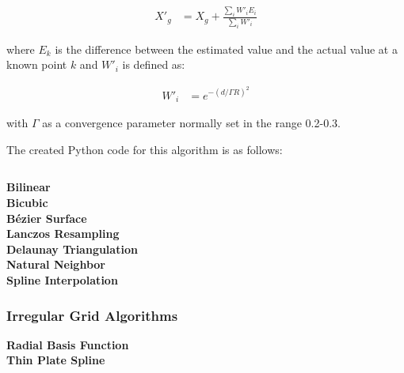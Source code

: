 				\begin{align*}
					X'_{g} &= X_{g} + \frac{\sum_{i}{W'_{i}E_{i}}}{\sum_{i}{W'_{i}}}
				\end{align*}

				where $E_{k}$ is the difference between the estimated value and the actual value at a known point $k$ and $W'_{i}$ is defined as:

				\begin{align*}
					W'_{i} &= e^{-(d/\Gamma R)^{2}}
				\end{align*}

				with $\Gamma$ as a convergence parameter normally set in the range 0.2-0.3.

				The created Python code for this algorithm is as follows:

				\inputminted[mathescape,linenos,numbersep=5pt,frame=lines,framesep=2mm]{python}{./code/barnes.py}

			\textbf{Bilinear}\label{datavalidation_bilinear} \\


			
			\textbf{Bicubic}\label{datavalidation_bicubic} \\
			
			\textbf{B\'{e}zier Surface}\label{datavalidation_beziersurface} \\
			
			\textbf{Lanczos Resampling}\label{datavalidation_lanczosresampling} \\
			
			\textbf{Delaunay Triangulation}\label{datavalidation_delaunaytriangulation} \\
			
			\textbf{Natural Neighbor}\label{datavalidation_naturalneighbour} \\
			
			\textbf{Spline Interpolation}\label{datavalidation_splineinterpolation} \\

		\subsubsection{Irregular Grid Algorithms}\label{datavalidation_irregular_grid}

			\textbf{Radial Basis Function}\label{datavalidation_radial_basis_function} \\

			\textbf{Thin Plate Spline}\label{datavalidation_thin_plate_spline} \\

